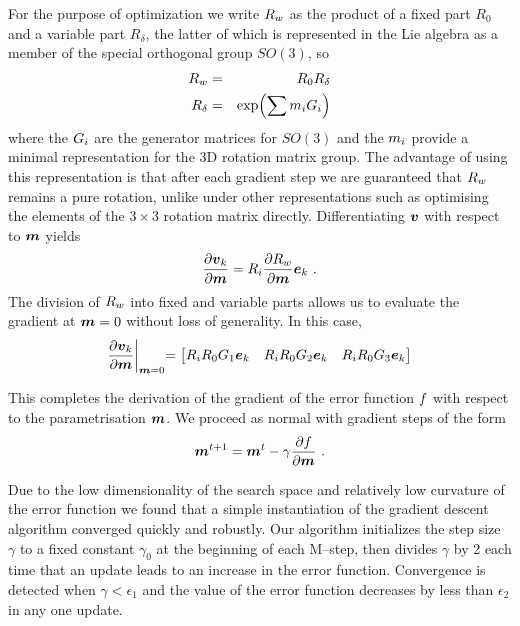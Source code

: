 For the purpose of optimization we write $\SceneR$ as the product of a
fixed part $R_0$ and a variable part $R_{\delta}$, the latter of which
is represented in the Lie algebra as a member of the special
orthogonal group $SO(3)$, so
\begin{eqnarray}
  \SceneR &=& R_0 R_{\delta} \\
  R_{\delta} &=& \exp\Bigl(\sum \LieM_i \Gen_i\Bigr)
\end{eqnarray}
where the $\Gen_i$ are the generator matrices for $SO(3)$ and the
$\LieM_i$ provide a minimal representation for the 3D rotation matrix
group. The advantage of using this representation is that after each
gradient step we are guaranteed that $\SceneR$ remains a pure
rotation, unlike under other representations such as optimising the
elements of the $3 \times 3$ rotation matrix directly. Differentiating
$\vpt$ with respect to $\LieMs$ yields
\begin{equation}
  \Deriv{\vpt_k}{\LieMs} = \CamR_i \Deriv{\SceneR}{\LieMs} \ebasis_k ~.
\end{equation}
The division of $\SceneR$ into fixed and variable parts allows us to
evaluate the gradient at $\LieMs=0$ without loss of generality. In
this case,
\begin{equation}
  \Deriv{\vpt_k}{\LieMs} \EvalAt{\LieMs=0} =
  \begin{bmatrix}
    \CamR_i R_0 \Gen_1 \ebasis_k &
    \CamR_i R_0 \Gen_2 \ebasis_k &
    \CamR_i R_0 \Gen_3 \ebasis_k
  \end{bmatrix}
\end{equation}

This completes the derivation of the gradient of the error function
$\ErrorFunc$ with respect to the parametrisation $\LieMs$. We proceed as
normal with gradient steps of the form
\begin{equation}
  \LieMs^{t+1} = \LieMs^t - \gamma \Deriv{\ErrorFunc}{\LieMs} ~.
\end{equation}

Due to the low dimensionality of the search space and relatively low
curvature of the error function we found that a simple instantiation
of the gradient descent algorithm converged quickly and robustly. Our
algorithm initializes the step size $\gamma$ to a fixed constant
$\gamma_0$ at the beginning of each M--step, then divides $\gamma$ by
2 each time that an update leads to an increase in the error
function. Convergence is detected when $\gamma<\epsilon_1$ and the
value of the error function decreases by less than $\epsilon_2$ in any
one update.

